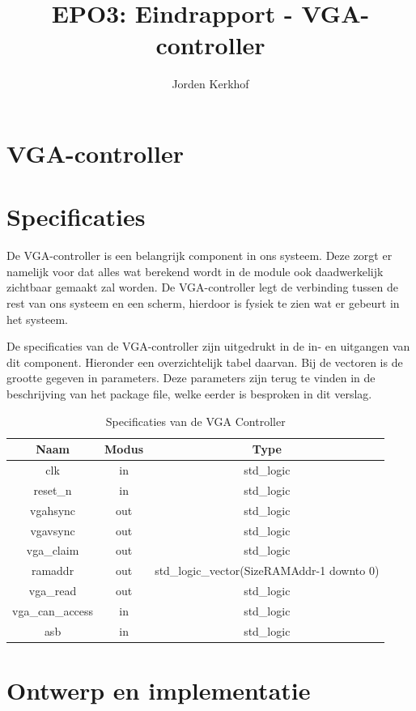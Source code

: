 \documentclass{scrartcl}  %
\author{ Jorden {Kerkhof}  }
\title{EPO3: Eindrapport - VGA-controller}
\begin{document}
\section{VGA-controller}
\label{ch:vga}
\section{Specificaties}

De VGA-controller is een belangrijk component in ons systeem. Deze zorgt er namelijk voor dat alles wat berekend wordt in de module ook daadwerkelijk zichtbaar gemaakt zal worden. De VGA-controller legt de verbinding tussen de rest van ons systeem en een scherm, hierdoor is fysiek te zien wat er gebeurt in het systeem. 

De specificaties van de VGA-controller zijn uitgedrukt in de in- en uitgangen van dit component. Hieronder een overzichtelijk tabel daarvan. Bij de vectoren is de grootte gegeven in parameters. Deze parameters zijn terug te vinden in de beschrijving van het package file, welke eerder is besproken in dit verslag.

\begin{table}[H]
	\centering
	\caption{Specificaties van de VGA Controller }
	\label{tab:spec-vgacontroller}
	\begin{tabular}{c c c}
		\hline\hline
	 	Naam & Modus & Type\\
	 	\hline	
		clk & in & std\_logic \\ 
		reset\_n & in & std\_logic \\ 
		vgahsync & out & std\_logic \\ 
		vgavsync & out & std\_logic \\ 
		vga\_claim & out & std\_logic \\ 
		ramaddr & out & std\_logic\_vector(SizeRAMAddr-1 downto 0) \\
		vga\_read & out & std\_logic \\
		vga\_can\_access & in & std\_logic \\
		asb & in & std\_logic \\
	  	\hline\hline
	\end{tabular}
\end{table}

\section{Ontwerp en implementatie}
\end{document}
